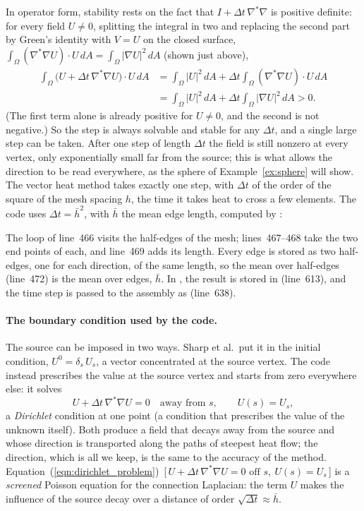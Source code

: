 In operator form, stability rests on the fact that $I + \Delta t\, \nabla^* \nabla$ is positive definite: for every field $U \ne 0$, splitting the integral in two and replacing the second part by Green's identity with $V = U$ on the closed surface, $\int_\Omega (\nabla^*\nabla U)\cdot U\, dA = \int_\Omega |\nabla U|^2\, dA$ (shown just above),
\begin{align*}
\int_\Omega \big(U + \Delta t\,\nabla^*\nabla U\big)\cdot U\, dA &= \int_\Omega |U|^2\, dA + \Delta t\int_\Omega (\nabla^*\nabla U)\cdot U\, dA \\
&= \int_\Omega |U|^2\, dA + \Delta t \int_\Omega |\nabla U|^2\, dA > 0 .
\end{align*}
(The first term alone is already positive for $U \neq 0$, and the second is not negative.)
So the step is always solvable and stable for any $\Delta t$, and a single large step can be taken. After one step of length $\Delta t$ the field is still nonzero at every vertex, only exponentially small far from the source; this is what allows the direction to be read everywhere, as the sphere of Example~\ref{ex:sphere} will show. The vector heat method takes exactly one step, with $\Delta t$ of the order of the square of the mesh spacing $h$, the time it takes heat to cross a few elements. The code uses $\Delta t = \bar h^2$, with $\bar h$ the mean edge length, computed by :

The loop of line~466 visits the half-edges of the mesh; lines~467--468 take the two end points of each, and line~469 adds its length. Every edge is stored as two half-edges, one for each direction, of the same length, so the mean over half-edges (line~472) is the mean over edges, $\bar h$. In , the result is stored in  (line~613), and the time step is passed to the assembly as  (line~638).

\paragraph{The boundary condition used by the code.} The source can be imposed in two ways. Sharp et al.\ put it in the initial condition, $U^0 = \delta_s\, U_s$, a vector concentrated at the source vertex. The code instead prescribes the value at the source vertex and starts from zero everywhere else: it solves
\begin{equation}
\label{eqn:dirichlet_problem}
U + \Delta t\, \nabla^* \nabla U = 0 \quad \text{away from } s, \qquad U(s) = U_s,
\end{equation}
a \emph{Dirichlet} condition at one point (a condition that prescribes the value of the unknown itself). Both produce a field that decays away from the source and whose direction is transported along the paths of steepest heat flow; the direction, which is all we keep, is the same to the accuracy of the method. Equation~(\ref{eqn:dirichlet_problem})~[\,$U + \Delta t\,\nabla^*\nabla U = 0 \text{ off } s,\ U(s) = U_s$\,] is a \emph{screened} Poisson equation for the connection Laplacian: the term $U$ makes the influence of the source decay over a distance of order $\sqrt{\Delta t} \approx \bar h$.

